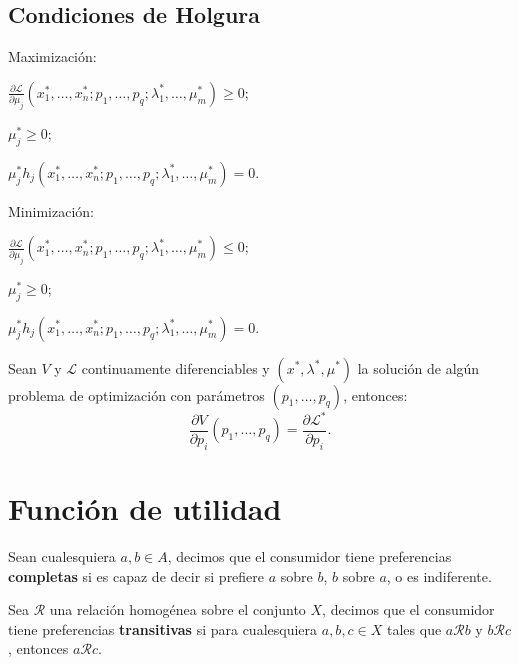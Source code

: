 \documentclass[8pt,a4paper]{extarticle}
\begin{document}
\begin{multicols}{3}
\subsection*{Condiciones de Holgura}

\begin{bulletlist}
\item Maximización:
\item[] $\displaystyle \frac{\partial \mathcal{L}}{\partial \mu_j} (x_{1}^{*}, \ldots, x_{n}^{*}; p_1, \ldots, p_q; \lambda_{1}^{*}, \ldots, \mu_{m}^{*}) \ge 0$;
\item[] $\displaystyle \mu_j^{*} \ge 0$;
\item[] $\displaystyle \mu_j^{*} h_j (x_{1}^{*}, \ldots, x_{n}^{*}; p_1, \ldots, p_q; \lambda_{1}^{*}, \ldots, \mu_{m}^{*}) = 0$.
\item Minimización:
\item[] $\displaystyle \frac{\partial \mathcal{L}}{\partial \mu_j} (x_{1}^{*}, \ldots, x_{n}^{*}; p_1, \ldots, p_q; \lambda_{1}^{*}, \ldots, \mu_{m}^{*}) \le 0$;
\item[] $\displaystyle \mu_j^{*} \ge 0$;
\item[] $\displaystyle \mu_j^{*} h_j (x_{1}^{*}, \ldots, x_{n}^{*}; p_1, \ldots, p_q; \lambda_{1}^{*}, \ldots, \mu_{m}^{*}) = 0$.
\end{bulletlist}

\begin{boxtheo}
	Sean $V$ y $\mathcal{L}$ continuamente diferenciables y $(x^{*}, \lambda^{*}, \mu^{*})$ la solución de algún problema de optimización con parámetros $(p_1, \ldots, p_q)$, entonces:
	\[
		\frac{\partial V}{\partial p_i} (p_1, \ldots, p_q) = \frac{\partial \mathcal{L}^{*}}{\partial p_i}
	.\] 
\end{boxtheo}

\newpage

\section{Función de utilidad}

\begin{boxdef}[Completitud]
	Sean cualesquiera $a, b \in A$, decimos que el consumidor tiene preferencias \textbf{completas} si es capaz de decir si prefiere $a$ sobre $b$, $b$ sobre $a$, o es indiferente.
\end{boxdef}

\begin{boxdef}[Transitividad]
	Sea $\mathcal{R}$ una relación homogénea sobre el conjunto $X$, decimos que el consumidor tiene preferencias \textbf{transitivas} si para cualesquiera $a, b, c \in X$ tales que $a \mathcal{R} b$ y $b \mathcal{R} c$, entonces $a \mathcal{R} c$.
\end{boxdef}


\end{multicols}
\end{document}
